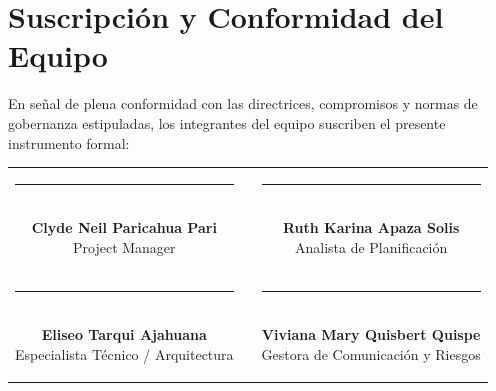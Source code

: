 \documentclass[11pt,a4paper]{article}
\begin{document}
\vspace{0.4cm}

\section{Suscripción y Conformidad del Equipo}
\noindent En señal de plena conformidad con las directrices, compromisos y normas de gobernanza estipuladas, los integrantes del equipo suscriben el presente instrumento formal:

\vspace{1.8cm}

\begin{center}
\begin{tabular}{c c c}
    \parbox{6.5cm}{\centering \rule{6.0cm}{0.6pt}\\[5pt] \textbf{Clyde Neil Paricahua Pari}\\[2pt] {\footnotesize Project Manager}} 
    & \hspace{0.8cm} &
    \parbox{6.5cm}{\centering \rule{6.0cm}{0.6pt}\\[5pt] \textbf{Ruth Karina Apaza Solis}\\[2pt] {\footnotesize Analista de Planificación}} 
    \\[2.2cm]
    \parbox{6.5cm}{\centering \rule{6.0cm}{0.6pt}\\[5pt] \textbf{Eliseo Tarqui Ajahuana}\\[2pt] {\footnotesize Especialista Técnico / Arquitectura}} 
    & \hspace{0.8cm} &
    \parbox{6.5cm}{\centering \rule{6.0cm}{0.6pt}\\[5pt] \textbf{Viviana Mary Quisbert Quispe}\\[2pt] {\footnotesize Gestora de Comunicación y Riesgos}}
\end{tabular}
\end{center}
\end{document}
